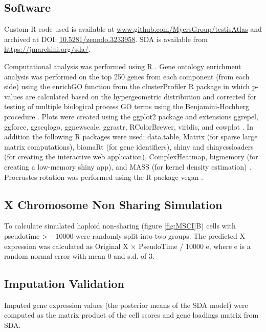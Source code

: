 \subsection{Software}
Custom R code used is available at \url{www.github.com/MyersGroup/testisAtlas} and archived at DOI: \href{http://www.doi.org/10.5281/zenodo.3233958}{10.5281/zenodo.3233958}. SDA is available from \url{https://jmarchini.org/sda/}.

Computational analysis was performed using R \parencite{RCoreTeam2018Language}. Gene ontology enrichment analysis was performed on the top 250 genes from each component (from each side) using the enrichGO function from the clusterProfiler R package in which p-values are calculated based on the hypergeometric distribution and corrected for testing of multiple biological process GO terms using the Benjamini-Hochberg procedure \parencite{Yu2012clusterProfiler}. Plots were created using the ggplot2 package and extensions ggrepel, ggforce, ggseqlogo, ggnewscale, ggrastr, RColorBrewer, viridis, and cowplot \parencite{Campitelli2019ggnewscale, Garnier2018viridis, Neuwirth2014RColorBrewer, Pedersen2016ggforce, Petukhov2018ggrastr, Wagih2017ggseqlogo, Wickham2016ggplot2, Wilke2018cowplot}. In addition the following R packages were used: data.table, Matrix (for sparse large matrix computations), biomaRt (for gene identifiers), shiny and shinycssloaders (for creating the interactive web application), ComplexHeatmap, bigmemory (for creating a low-memory shiny app), and MASS (for kernel density estimation) \parencite{Bates2018Matrix, Chang2018shiny, Dowle2019data, Durinck2005BioMart, Gu2016Complex, Kane2013Scalable, Sali2017shinycssloaders, Venables2002Modern}. Procrustes rotation was performed using the R package vegan \parencite{Lin2019NNLM, Oksanen2019vegan}.

\subsection{X Chromosome Non Sharing Simulation}
\label{sec:msci_methods}
To calculate simulated haploid non-sharing (figure \ref{fig:MSCI}B) cells with pseudotime > $-10000$ were randomly split into two groups. The predicted X expression was calculated as Original X $\times$ PseudoTime / 10000  e, where e is a random normal error with mean 0 and s.d. of 3.

\subsection{Imputation Validation}
\label{sec:imputation_methods}
Imputed gene expression values (the posterior means of the SDA model) were computed as the matrix product of the cell scores and gene loadings matrix from SDA.

